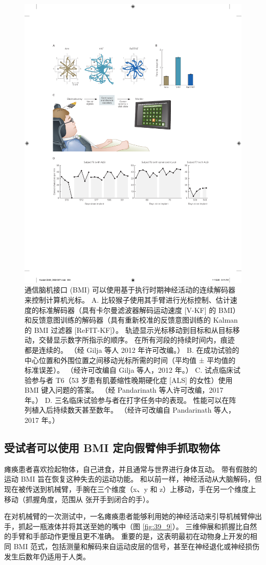\begin{figure}[htbp]
	\centering
	\includegraphics[width=0.5\linewidth]{chap39/fig_39_8}
	\caption{通信脑机接口 (BMI) 可以使用基于执行时期神经活动的连续解码器来控制计算机光标。 
		A. 比较猴子使用其手臂进行光标控制、估计速度的标准解码器（具有卡尔曼滤波器解码运动速度 [V-KF] 的 BMI）和反馈意图训练的解码器（具有重新校准的反馈意图训练的 Kalman 的 BMI 过滤器 [ReFIT-KF]）。 
		轨迹显示光标移动到目标和从目标移动，交替显示数字所指示的顺序。 在所有河段的持续时间内，痕迹都是连续的。 
		（经 Gilja 等人 2012 年许可改编。）
		B. 在成功试验的中心位置和外围位置之间移动光标所需的时间（平均值 ± 平均值的标准误差）。 
		（经许可改编自 Gilja 等人，2012 年。）
		C. 试点临床试验参与者 T6（53 岁患有肌萎缩性晚期硬化症 [ALS] 的女性）使用 BMI 键入问题的答案。 
		（经 Pandarinath 等人许可改编，2017 年。）
		D. 三名临床试验参与者在打字任务中的表现。 性能可以在阵列植入后持续数天甚至数年。 
		（经许可改编自 Pandarinath 等人，2017 年。）}
	\label{fig:39_8}
\end{figure}

\subsection{受试者可以使用 BMI 定向假臂伸手抓取物体}
瘫痪患者喜欢捡起物体，自己进食，并且通常与世界进行身体互动。 
带有假肢的运动 BMI 旨在恢复这种失去的运动功能。 
和以前一样，神经活动从大脑解码，但现在被传送到机械臂，手腕在三个维度（x、y 和 z）上移动，手在另一个维度上移动（抓握角度，范围从 张开手到闭合的手）。


在对机械臂的一次测试中，一名瘫痪患者能够利用她的神经活动来引导机械臂伸出手，抓起一瓶液体并将其送至她的嘴中（图 \ref{fig:39_9}）。 
三维伸展和抓握比自然的手臂和手部动作更慢且更不准确。 
重要的是，这表明最初在动物身上开发的相同 BMI 范式，包括测量和解码来自运动皮层的信号，甚至在神经退化或神经损伤发生后数年仍适用于人类。


